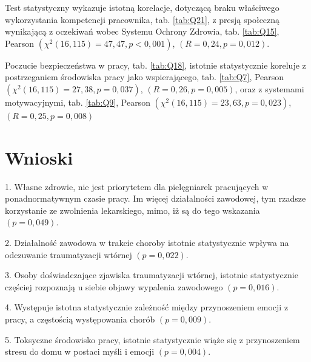\documentclass[a4paper,12pt,twoside,openright]{mwrep}
\begin{document}
Test statystyczny wykazuje istotną korelacje, dotyczącą braku właściwego wykorzystania kompetencji pracownika, tab. \ref{tab:Q21}, z presją społeczną wynikającą z oczekiwań wobec Systemu Ochrony Zdrowia, tab. \ref{tab:Q15}, Pearson $(\chi^2 (16, 115) = 47,47, p < 0,001)$, $(R = 0,24, p = 0,012)$.







%

Poczucie bezpieczeństwa w pracy, tab. \ref{tab:Q18}, istotnie statystycznie koreluje z postrzeganiem środowiska pracy jako wspierającego, tab. \ref{tab:Q7}, Pearson $(\chi^2 (16, 115) = 27,38, p = 0,037)$, $(R = 0,26, p = 0,005)$, oraz z systemami motywacyjnymi, tab. \ref{tab:Q9}, Pearson $(\chi^2 (16, 115) = 23,63, p = 0,023)$, $(R = 0,25, p = 0,008)$
	



\vspace{\baselineskip} 


\chapter*{Wnioski}


1. Własne zdrowie, nie jest priorytetem dla pielęgniarek pracujących w ponadnormatywnym czasie pracy. Im  więcej działalności zawodowej, tym rzadsze korzystanie ze zwolnienia lekarskiego, mimo, iż są do tego wskazania $( p=0,049)$.

2. Działalność zawodowa w trakcie choroby istotnie statystycznie wpływa na odczuwanie traumatyzacji wtórnej $(p = 0,022)$.

3.  Osoby doświadczające zjawiska traumatyzacji wtórnej,  istotnie statystycznie częściej rozpoznają u siebie objawy wypalenia zawodowego $( p=0,016)$.

4. Występuje  istotna statystycznie zależność między przynoszeniem emocji z pracy, a częstością występowania chorób $(p=0,009)$.

5. Toksyczne środowisko pracy, istotnie statystycznie wiąże się z przynoszeniem stresu do domu w postaci myśli i emocji $( p = 0,004)$.
\end{document}
